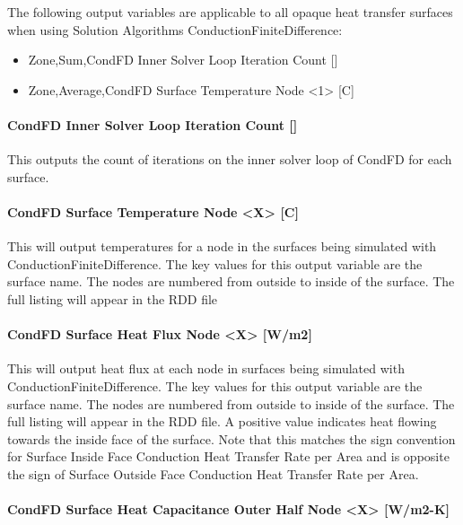 The following output variables are applicable to all opaque heat transfer surfaces when using Solution Algorithms ConductionFiniteDifference:

\begin{itemize}
\item
  Zone,Sum,CondFD Inner Solver Loop Iteration Count {[]}
\item
  Zone,Average,CondFD Surface Temperature Node \textless{}1\textgreater{} {[}C{]}
\end{itemize}

\paragraph{CondFD Inner Solver Loop Iteration Count {[]}}\label{condfd-inner-solver-loop-iteration-count}

This outputs the count of iterations on the inner solver loop of CondFD for each surface.

\paragraph{CondFD Surface Temperature Node \textless{}X\textgreater{} {[}C{]}}\label{condfd-surface-temperature-node-x-c}

This will output temperatures for a node in the surfaces being simulated with ConductionFiniteDifference. The key values for this output variable are the surface name. The nodes are numbered from outside to inside of the surface. The full listing will appear in the RDD file

\paragraph{CondFD Surface Heat Flux Node \textless{}X\textgreater{} {[}W/m2{]}}\label{condfd-surface-heat-flux-node-x-wm2}

This will output heat flux at each node in surfaces being simulated with ConductionFiniteDifference. The key values for this output variable are the surface name. The nodes are numbered from outside to inside of the surface. The full listing will appear in the RDD file. A positive value indicates heat flowing towards the inside face of the surface. Note that this matches the sign convention for Surface Inside Face Conduction Heat Transfer Rate per Area and is opposite the sign of Surface Outside Face Conduction Heat Transfer Rate per Area.

\paragraph{CondFD Surface Heat Capacitance Outer Half Node \textless{}X\textgreater{} {[}W/m2-K{]}}\label{condfd-surface-heat-capacitance-outer-half-node-x-wm2-k}

